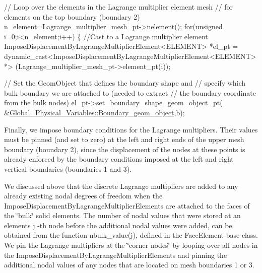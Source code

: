 \begin{DoxyCodeInclude}

 
 \textcolor{comment}{// Loop over the elements in the Lagrange multiplier element mesh}
 \textcolor{comment}{// for elements on the top boundary (boundary 2)}
 n\_element=Lagrange\_multiplier\_mesh\_pt->nelement();
 \textcolor{keywordflow}{for}(\textcolor{keywordtype}{unsigned} i=0;i<n\_element;i++)
  \{
   \textcolor{comment}{//Cast to a Lagrange multiplier element}
   ImposeDisplacementByLagrangeMultiplierElement<ELEMENT> *el\_pt = 
    \textcolor{keyword}{dynamic\_cast<}ImposeDisplacementByLagrangeMultiplierElement<ELEMENT>*\textcolor{keyword}{>}
    (Lagrange\_multiplier\_mesh\_pt->element\_pt(i));

   \textcolor{comment}{// Set the GeomObject that defines the boundary shape and}
   \textcolor{comment}{// specify which bulk boundary we are attached to (needed to extract}
   \textcolor{comment}{// the boundary coordinate from the bulk nodes)}
   el\_pt->set\_boundary\_shape\_geom\_object\_pt( 
    &\hyperlink{namespaceGlobal__Physical__Variables_ab0a184463cbaaa353f2235411adef3c4}{Global\_Physical\_Variables::Boundary\_geom\_object},b);

\end{DoxyCodeInclude}


Finally, we impose boundary conditions for the Lagrange multipliers. Their values must be pinned (and set to zero) at the left and right ends of the upper mesh boundary (boundary 2), since the displacement of the nodes at these points is already enforced by the boundary conditions imposed at the left and right vertical boundaries (boundaries 1 and 3).

\label{_bcs_for_lagrange_multipliers}%
 We discussed above that the discrete Lagrange multipliers are added to any already existing nodal degrees of freedom when the {\ttfamily Impose\+Displacement\+By\+Lagrange\+Multiplier\+Elements} are attached to the faces of the \char`\"{}bulk\char`\"{} solid elements. The number of nodal values that were stored at an element\textquotesingle{}s {\ttfamily j} -\/th node before the additional nodal values were added, can be obtained from the function {\ttfamily nbulk\+\_\+value(j)}, defined in the {\ttfamily Face\+Element} base class. We pin the Lagrange multipliers at the \char`\"{}corner nodes\char`\"{} by looping over all nodes in the {\ttfamily Impose\+Displacement\+By\+Lagrange\+Multiplier\+Elements} and pinning the additional nodal values of any nodes that are located on mesh boundaries 1 or 3.


